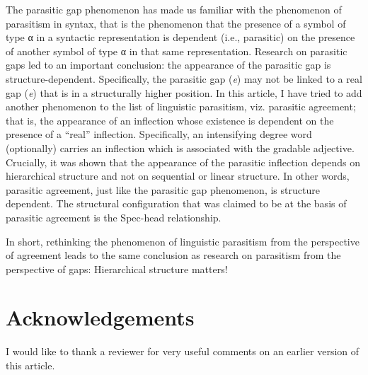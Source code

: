 \documentclass[output=paper]{langsci/langscibook}
\begin{document}
The parasitic gap phenomenon has made us familiar with the phenomenon of
parasitism in syntax, that is the phenomenon that the presence of a symbol of
type α in a syntactic representation is dependent (i.e., parasitic) on the
presence of another symbol of type α in that same representation. Research on
parasitic gaps led to an important conclusion: the appearance of the parasitic
gap is structure-dependent. Specifically, the parasitic gap
(\emph{e}\textsubscript{\Pg{}}) may not be linked to a real gap
(\emph{e}\textsubscript{\Rg{}}) that is in a structurally higher position. In
this article, I have tried to add another phenomenon to the list of linguistic
parasitism, viz. parasitic agreement; that is, the appearance of an inflection
whose existence is dependent on the presence of a \enquote{real} inflection.
Specifically, an intensifying degree word (optionally) carries an inflection
which is associated with the gradable adjective. Crucially, it was shown that
the appearance of the parasitic inflection depends on hierarchical structure
and not on sequential or linear structure. In other words, parasitic agreement,
just like the parasitic gap phenomenon, is structure dependent. The structural
configuration that was claimed to be at the basis of parasitic agreement is the
Spec-head relationship.

In short, rethinking the phenomenon of linguistic parasitism from the
perspective of agreement leads to the same conclusion as research on parasitism
from the perspective of gaps: Hierarchical structure matters!

\printchapterglossary{}

\section*{Acknowledgements}

I would like to thank a reviewer for very useful comments on an earlier version
of this article.

{\sloppy
\printbibliography[heading=subbibliography,notkeyword=this]
}
\end{document}
